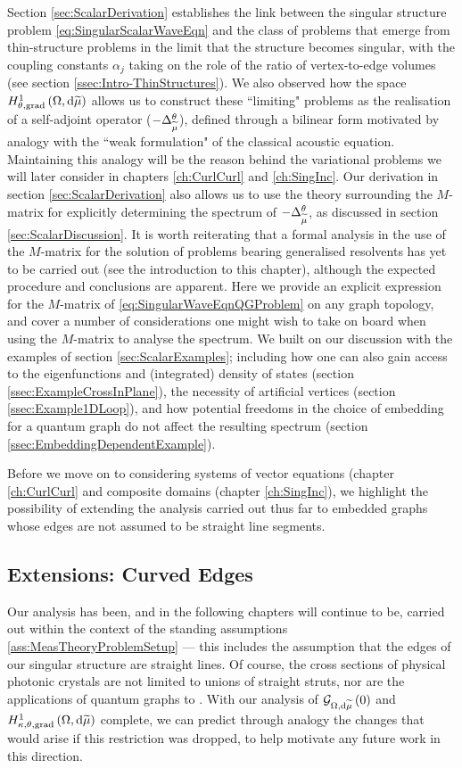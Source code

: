 Section \ref{sec:ScalarDerivation} establishes the link between the singular structure problem \eqref{eq:SingularScalarWaveEqn} and the class of problems that emerge from thin-structure problems in the limit that the structure becomes singular, with the coupling constants $\alpha_j$ taking on the role of the ratio of vertex-to-edge volumes (see section \ref{ssec:Intro-ThinStructures}).
We also observed how the space $H^1_{\theta, \mathrm{grad}}\left( \Omega, \mathrm{d}\widetilde{\mu} \right)$ allows us to construct these ``limiting" problems as the realisation of a self-adjoint operator ($-\Delta_{\widetilde{\mu}}^{\theta}$), defined through a bilinear form motivated by analogy with the ``weak formulation" of the classical acoustic equation.
Maintaining this analogy will be the reason behind the variational problems we will later consider in chapters \ref{ch:CurlCurl} and \ref{ch:SingInc}.
Our derivation in section \ref{sec:ScalarDerivation} also allows us to use the theory surrounding the $M$-matrix for explicitly determining the spectrum of $-\Delta_{\widetilde{\mu}}^{\theta}$, as discussed in section \ref{sec:ScalarDiscussion}.
It is worth reiterating that a formal analysis in the use of the $M$-matrix for the solution of problems bearing generalised resolvents has yet to be carried out (see the introduction to this chapter), although the expected procedure and conclusions are apparent.
Here we provide an explicit expression for the $M$-matrix of \eqref{eq:SingularWaveEqnQGProblem} on any graph topology, and cover a number of considerations one might wish to take on board when using the $M$-matrix to analyse the spectrum.
We built on our discussion with the examples of section \ref{sec:ScalarExamples}; including how one can also gain access to the eigenfunctions and (integrated) density of states (section \ref{ssec:ExampleCrossInPlane}), the necessity of artificial vertices (section \ref{ssec:Example1DLoop}), and how potential freedoms in the choice of embedding for a quantum graph do not affect the resulting spectrum (section \ref{ssec:EmbeddingDependentExample}).

Before we move on to considering systems of vector equations (chapter \ref{ch:CurlCurl} and composite domains (chapter \ref{ch:SingInc}), we highlight the possibility of extending the analysis carried out thus far to embedded graphs whose edges are not assumed to be straight line segments.

\subsection{Extensions: Curved Edges} \label{ssec:CurvedEdges}
Our analysis has been, and in the following chapters will continue to be, carried out within the context of the standing assumptions \ref{ass:MeasTheoryProblemSetup} --- this includes the assumption that the edges of our singular structure are straight lines.
Of course, the cross sections of physical photonic crystals are not limited to unions of straight struts, nor are the applications of quantum graphs to .
With our analysis of $\mathcal{G}_{ \Omega, \mathrm{d}\widetilde{\mu}}\left( 0 \right)$ and $H^1_{\kappa,\theta,\mathrm{grad}}\left( \Omega, \mathrm{d}\widetilde{\mu} \right)$ complete, we can predict through analogy the changes that would arise if this restriction was dropped, to help motivate any future work in this direction.

